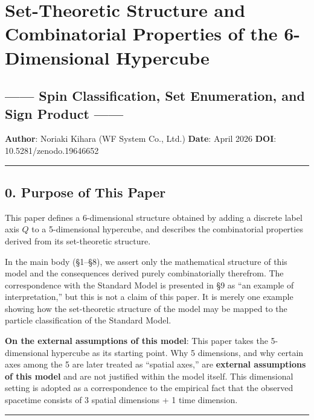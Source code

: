 \documentclass[
  a4paper,11pt]{article}
\theoremstyle{definition}
\theoremstyle{remark}
\begin{document}
\section{Set-Theoretic Structure and Combinatorial Properties of the
6-Dimensional
Hypercube}\label{set-theoretic-structure-and-combinatorial-properties-of-the-6-dimensional-hypercube}

\subsection{------ Spin Classification, Set Enumeration, and Sign
Product
------}\label{spin-classification-set-enumeration-and-sign-product}

\textbf{Author}: Noriaki Kihara (WF System Co., Ltd.) \textbf{Date}:
April 2026 \textbf{DOI}: 10.5281/zenodo.19646652

\begin{center}\rule{0.5\linewidth}{0.5pt}\end{center}

\subsection{0. Purpose of This Paper}\label{purpose-of-this-paper}

This paper defines a 6-dimensional structure obtained by adding a
discrete label axis \(Q\) to a 5-dimensional hypercube, and describes
the combinatorial properties derived from its set-theoretic structure.

In the main body (§1--§8), we assert only the mathematical structure of
this model and the consequences derived purely combinatorially
therefrom. The correspondence with the Standard Model is presented in §9
as ``an example of interpretation,'' but this is not a claim of this
paper. It is merely one example showing how the set-theoretic structure
of the model may be mapped to the particle classification of the
Standard Model.

\textbf{On the external assumptions of this model}: This paper takes the
5-dimensional hypercube as its starting point. Why 5 dimensions, and why
certain axes among the 5 are later treated as ``spatial axes,'' are
\textbf{external assumptions of this model} and are not justified within
the model itself. This dimensional setting is adopted as a
correspondence to the empirical fact that the observed spacetime
consists of 3 spatial dimensions + 1 time dimension.

\begin{center}\rule{0.5\linewidth}{0.5pt}\end{center}
\end{document}
